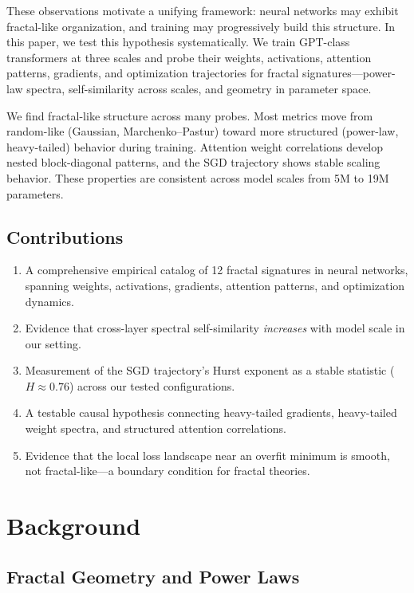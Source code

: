 \documentclass[11pt,a4paper]{article}
\begin{document}
These observations motivate a unifying framework: neural networks may exhibit fractal-like organization, and training may progressively build this structure. In this paper, we test this hypothesis systematically. We train GPT-class transformers at three scales and probe their weights, activations, attention patterns, gradients, and optimization trajectories for fractal signatures---power-law spectra, self-similarity across scales, and geometry in parameter space.

We find fractal-like structure across many probes. Most metrics move from random-like (Gaussian, Marchenko--Pastur) toward more structured (power-law, heavy-tailed) behavior during training. Attention weight correlations develop nested block-diagonal patterns, and the SGD trajectory shows stable scaling behavior. These properties are consistent across model scales from 5M to 19M parameters.

\subsection{Contributions}

\begin{enumerate}[leftmargin=*]
    \item A comprehensive empirical catalog of 12 fractal signatures in neural networks, spanning weights, activations, gradients, attention patterns, and optimization dynamics.
    \item Evidence that cross-layer spectral self-similarity \emph{increases} with model scale in our setting.
    \item Measurement of the SGD trajectory's Hurst exponent as a stable statistic ($H \approx 0.76$) across our tested configurations.
    \item A testable causal hypothesis connecting heavy-tailed gradients, heavy-tailed weight spectra, and structured attention correlations.
    \item Evidence that the local loss landscape near an overfit minimum is smooth, not fractal-like---a boundary condition for fractal theories.
\end{enumerate}

\section{Background}

\subsection{Fractal Geometry and Power Laws}
\end{document}

